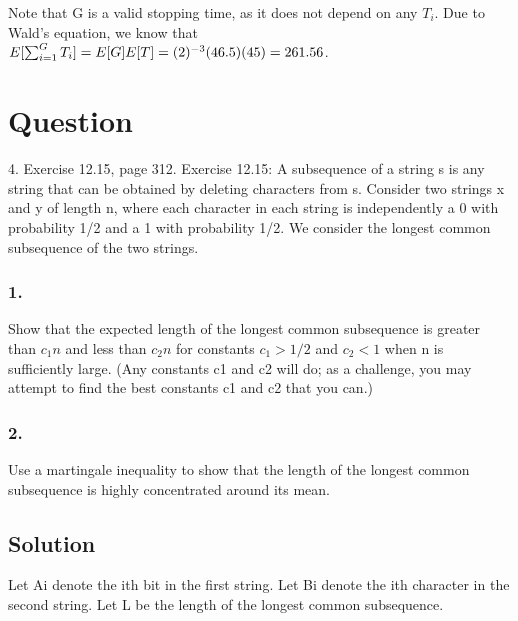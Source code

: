 \documentclass[10pt]{amsart}
\theoremstyle{remark}
\begin{document}
Note that G is a valid stopping time, as it does not depend on any $T_{i}$. Due to Wald's equation, we know that $E[\sum_{i=1}^{G}T_{i}] = E[G]E[T] \\
= (2)^{-3}(46.5)(45) = 261.56$.

\section{Question}
4. Exercise 12.15, page 312. Exercise 12.15: A subsequence of a string s is any string that can be obtained by deleting characters from s. Consider two strings x and y of length n, where each character in each string is independently a 0 with probability 1/2 and a 1 with probability 1/2. We consider the longest common subsequence of the two strings.

\subsubsection{1.}
Show that the expected length of the longest common subsequence is greater than $c_{1}n$ and less than $c_{2}n$ for constants $c_{1}>1/2$ and $c_{2}<1$ when n is sufficiently large. (Any constants c1 and c2 will do; as a challenge, you may attempt to find the best constants c1 and c2 that you can.)
\subsubsection{2.}
Use a martingale inequality to show that the length of the longest common subsequence is highly concentrated around its mean.

\subsection{Solution}

Let Ai denote the ith bit in the first string. Let Bi denote the ith character in the second string. Let L be the length of the longest common subsequence.
\end{document}

